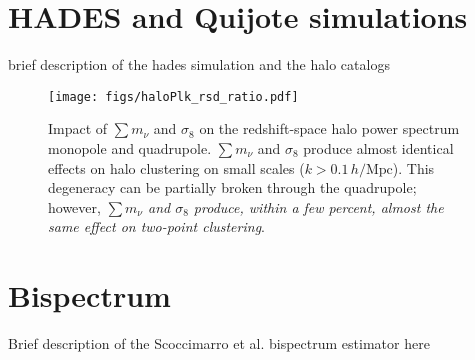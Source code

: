 \documentclass[12pt, letterpaper, preprint]{aastex62}
\newcommand{\smnu}{\sum m_\nu}
\newcommand{\sig}{\sigma_8}
\newcommand{\hmpc}{\,h/\mathrm{Mpc}}
\begin{document}
\section{HADES and Quijote simulations} \label{sec:hades} 
brief description of the hades simulation and the halo catalogs

\begin{figure}
\begin{center}
\texttt{[image: figs/haloPlk\_rsd\_ratio.pdf]}
    \caption{Impact of $\smnu$ and $\sig$ on the redshift-space halo power 
    spectrum monopole and quadrupole. $\smnu$ and $\sig$ produce almost identical 
    effects on halo clustering on small scales ($k > 0.1\hmpc$). This degeneracy 
    can be partially broken through the quadrupole; however, {\em $\smnu$ and $\sig$ 
    produce, within a few percent, almost the same effect on two-point clustering}.
    }
\label{fig:plk}
\end{center}
\end{figure}

\section{Bispectrum} \label{sec:bk} 
Brief description of the Scoccimarro et al. bispectrum estimator here 
\end{document}
